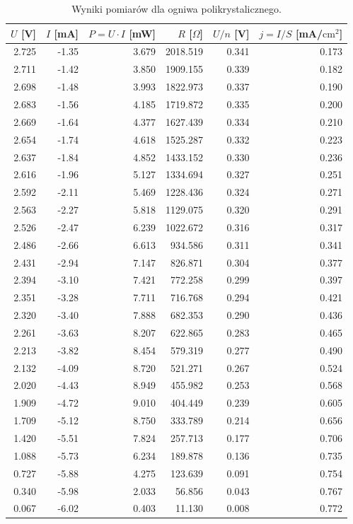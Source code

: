 \documentclass{fizykalab}
\begin{document}
\begin{table}[H]
    \centering
    \caption{Wyniki pomiarów dla ogniwa polikrystalicznego.}
\begin{tabular}{rrrrrr}
\toprule
$U$ [V] & $I$ [mA] & $P = U \cdot I$ [mW] & $R$ [$\Omega$] & $U/n$ [V] & $j=I/S$ [mA/$\text{cm}^2$] \\
\midrule
2.725 & -1.35 & 3.679 & 2018.519 & 0.341 & 0.173 \\
2.711 & -1.42 & 3.850 & 1909.155 & 0.339 & 0.182 \\
2.698 & -1.48 & 3.993 & 1822.973 & 0.337 & 0.190 \\
2.683 & -1.56 & 4.185 & 1719.872 & 0.335 & 0.200 \\
2.669 & -1.64 & 4.377 & 1627.439 & 0.334 & 0.210 \\
2.654 & -1.74 & 4.618 & 1525.287 & 0.332 & 0.223 \\
2.637 & -1.84 & 4.852 & 1433.152 & 0.330 & 0.236 \\
2.616 & -1.96 & 5.127 & 1334.694 & 0.327 & 0.251 \\
2.592 & -2.11 & 5.469 & 1228.436 & 0.324 & 0.271 \\
2.563 & -2.27 & 5.818 & 1129.075 & 0.320 & 0.291 \\
2.526 & -2.47 & 6.239 & 1022.672 & 0.316 & 0.317 \\
2.486 & -2.66 & 6.613 & 934.586 & 0.311 & 0.341 \\
2.431 & -2.94 & 7.147 & 826.871 & 0.304 & 0.377 \\
2.394 & -3.10 & 7.421 & 772.258 & 0.299 & 0.397 \\
2.351 & -3.28 & 7.711 & 716.768 & 0.294 & 0.421 \\
2.320 & -3.40 & 7.888 & 682.353 & 0.290 & 0.436 \\
2.261 & -3.63 & 8.207 & 622.865 & 0.283 & 0.465 \\
2.213 & -3.82 & 8.454 & 579.319 & 0.277 & 0.490 \\
2.132 & -4.09 & 8.720 & 521.271 & 0.267 & 0.524 \\
2.020 & -4.43 & 8.949 & 455.982 & 0.253 & 0.568 \\
1.909 & -4.72 & 9.010 & 404.449 & 0.239 & 0.605 \\
1.709 & -5.12 & 8.750 & 333.789 & 0.214 & 0.656 \\
1.420 & -5.51 & 7.824 & 257.713 & 0.177 & 0.706 \\
1.088 & -5.73 & 6.234 & 189.878 & 0.136 & 0.735 \\
0.727 & -5.88 & 4.275 & 123.639 & 0.091 & 0.754 \\
0.340 & -5.98 & 2.033 & 56.856 & 0.043 & 0.767 \\
0.067 & -6.02 & 0.403 & 11.130 & 0.008 & 0.772 \\
\bottomrule
\end{tabular}
\end{table}
\end{document}
